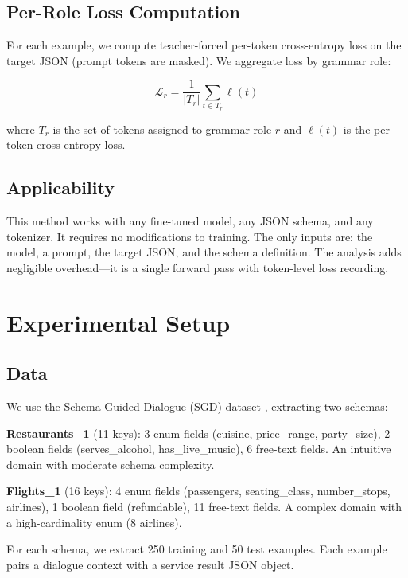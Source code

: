 \documentclass[11pt]{article}
\begin{document}
\subsection{Per-Role Loss Computation}

For each example, we compute teacher-forced per-token cross-entropy loss on the target JSON (prompt tokens are masked). We aggregate loss by grammar role:

\begin{equation}
\mathcal{L}_r = \frac{1}{|T_r|} \sum_{t \in T_r} \ell(t)
\end{equation}

where $T_r$ is the set of tokens assigned to grammar role $r$ and $\ell(t)$ is the per-token cross-entropy loss.

\subsection{Applicability}

This method works with any fine-tuned model, any JSON schema, and any tokenizer. It requires no modifications to training. The only inputs are: the model, a prompt, the target JSON, and the schema definition. The analysis adds negligible overhead---it is a single forward pass with token-level loss recording.

\section{Experimental Setup}

\subsection{Data}

We use the Schema-Guided Dialogue (SGD) dataset \cite{rastogi2020sgd}, extracting two schemas:

\textbf{Restaurants\_1} (11 keys): 3 enum fields (cuisine, price\_range, party\_size), 2 boolean fields (serves\_alcohol, has\_live\_music), 6 free-text fields. An intuitive domain with moderate schema complexity.

\textbf{Flights\_1} (16 keys): 4 enum fields (passengers, seating\_class, number\_stops, airlines), 1 boolean field (refundable), 11 free-text fields. A complex domain with a high-cardinality enum (8 airlines).

For each schema, we extract 250 training and 50 test examples. Each example pairs a dialogue context with a service result JSON object.
\end{document}
